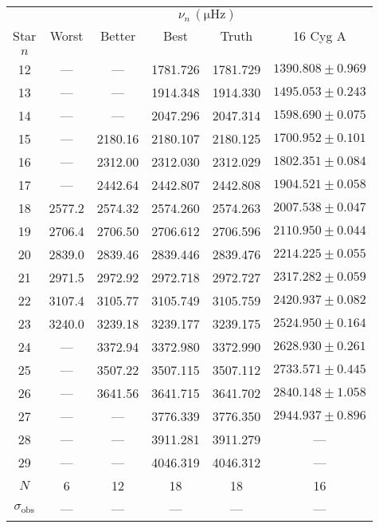 \begin{tabular}{c|cccc|c}
\toprule
 & \multicolumn{5}{c}{$\nu_n \, (\mathrm{\mu Hz})$} \\
Star & Worst & Better & Best & Truth & 16 Cyg A \\
$n$ &  &  &  &  &  \\
\midrule
12 & --- & --- & 1781.726 & 1781.729 & $1390.808 \pm 0.969$ \\
13 & --- & --- & 1914.348 & 1914.330 & $1495.053 \pm 0.243$ \\
14 & --- & --- & 2047.296 & 2047.314 & $1598.690 \pm 0.075$ \\
15 & --- & 2180.16 & 2180.107 & 2180.125 & $1700.952 \pm 0.101$ \\
16 & --- & 2312.00 & 2312.030 & 2312.029 & $1802.351 \pm 0.084$ \\
17 & --- & 2442.64 & 2442.807 & 2442.808 & $1904.521 \pm 0.058$ \\
18 & 2577.2 & 2574.32 & 2574.260 & 2574.263 & $2007.538 \pm 0.047$ \\
19 & 2706.4 & 2706.50 & 2706.612 & 2706.596 & $2110.950 \pm 0.044$ \\
20 & 2839.0 & 2839.46 & 2839.446 & 2839.476 & $2214.225 \pm 0.055$ \\
21 & 2971.5 & 2972.92 & 2972.718 & 2972.727 & $2317.282 \pm 0.059$ \\
22 & 3107.4 & 3105.77 & 3105.749 & 3105.759 & $2420.937 \pm 0.082$ \\
23 & 3240.0 & 3239.18 & 3239.177 & 3239.175 & $2524.950 \pm 0.164$ \\
24 & --- & 3372.94 & 3372.980 & 3372.990 & $2628.930 \pm 0.261$ \\
25 & --- & 3507.22 & 3507.115 & 3507.112 & $2733.571 \pm 0.445$ \\
26 & --- & 3641.56 & 3641.715 & 3641.702 & $2840.148 \pm 1.058$ \\
27 & --- & --- & 3776.339 & 3776.350 & $2944.937 \pm 0.896$ \\
28 & --- & --- & 3911.281 & 3911.279 & --- \\
29 & --- & --- & 4046.319 & 4046.312 & --- \\
\midrule%
$N$ & 6 & 12 & 18 & 18 & 16 \\
$\sigma_\mathrm{obs}$ & --- & --- & --- & --- & --- \\
\bottomrule
\end{tabular}
